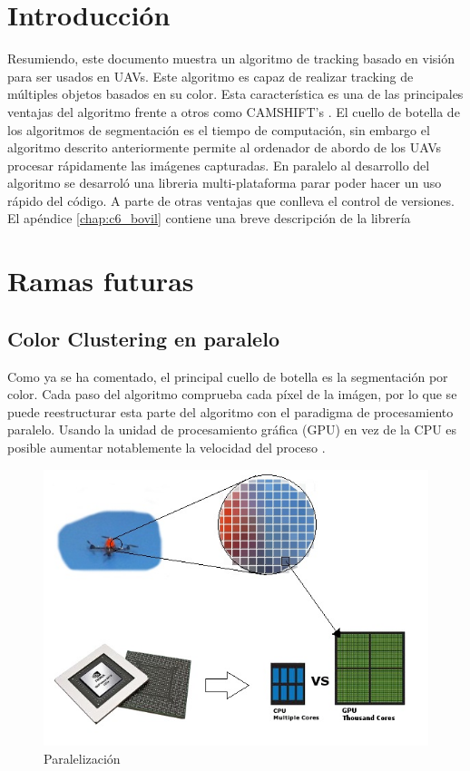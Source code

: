 \section{Introducci\'on}
	Resumiendo, este documento muestra un algoritmo de tracking basado en visi\'on para ser usados en UAVs. Este algoritmo es capaz de realizar tracking de m\'ultiples objetos basados en su color. Esta caracter\'istica es una de las principales ventajas del algoritmo frente a otros como CAMSHIFT's \cite{CAMSHIFT_FAST} \cite{CAMSHIFT_ENVIROMENT}. El cuello de botella de los algoritmos de segmentaci\'on es el tiempo de computaci\'on, sin embargo el algoritmo descrito anteriormente permite al ordenador de abordo de los UAVs procesar r\'apidamente las im\'agenes capturadas.
	En paralelo al desarrollo del algoritmo se desarrol\'o una libreria multi-plataforma parar poder hacer un uso r\'apido del c\'odigo. A parte de otras ventajas que conlleva el control de versiones. El ap\'endice \ref{chap:c6_bovil} contiene una breve descripci\'on de la librer\'ia
	
\section{Ramas futuras}	
	\subsection{Color Clustering en paralelo}
	Como ya se ha comentado, el principal cuello de botella es la segmentaci\'on por color. Cada paso del algoritmo comprueba cada p\'ixel de la im\'agen, por lo que se puede reestructurar esta parte del algoritmo con el paradigma de procesamiento paralelo. Usando la unidad de procesamiento gr\'afica (GPU) en vez de la CPU es posible aumentar notablemente la velocidad del proceso \cite{GPU_CPU_performance} \cite{GPU_parallel_image_processing} \cite{GPU_enabled_parrallel}.
		
	\begin{figure}[ph]
		\centering
		\includegraphics[width=0.7\linewidth]{../Images/c5/gpu}
		\caption{Paralelizaci\'on}
		\label{fig:gpu}
	\end{figure}


